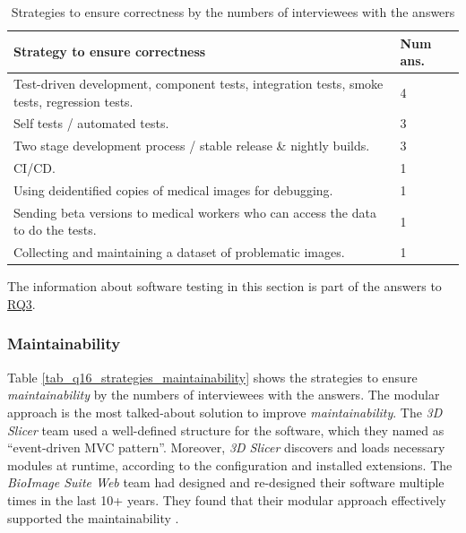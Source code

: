 \documentclass[3p, 12pt,authoryear]{elsarticle}
\begin{document}
\begin{table}[ht]
\centering
\hspace*{-1.5cm}\begin{tabular}{ll}
\hline
Strategy to ensure correctness & Num ans. \\ \hline
Test-driven development, component tests, integration tests, smoke tests, regression tests. & 4 \\
Self tests / automated tests. & 3 \\
Two stage development process / stable release \& nightly builds. & 3 \\
CI/CD. & 1 \\
Using deidentified copies of medical images for debugging. & 1 \\
Sending beta versions to medical workers who can access the data to do the tests. & 1 \\
Collecting and maintaining a dataset of problematic images. & 1 \\ \hline
\end{tabular}
\caption{\label{tab_q15_strategies_correctness}Strategies to ensure correctness
by the numbers of interviewees with the answers}
\end{table}

The information about software testing in this section is part of the answers to
\hyperlink{rq3}{RQ3}.

\subsubsection{Maintainability} \label{sec_interview_maintainability}


Table \ref{tab_q16_strategies_maintainability} shows the strategies to ensure
\textit{maintainability} by the numbers of interviewees with the answers. The
modular approach is the most talked-about solution to improve
\textit{maintainability}. The \textit{3D Slicer} team used a well-defined
structure for the software, which they named as ``event-driven MVC pattern''.
Moreover, \textit{3D Slicer} discovers and loads necessary modules at runtime,
according to the configuration and installed extensions. The \textit{BioImage
Suite Web} team had designed and re-designed their software multiple times in
the last 10+ years. They found that their modular approach effectively supported
the maintainability \citep{Joshi2011}. 
\end{document}

